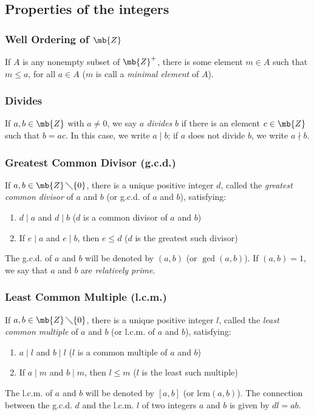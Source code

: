 \subsection{Properties of the integers}
\subsubsection{Well Ordering of \texorpdfstring{$\mb{Z}$}{Z}}
If $A$ is any nonempty subset of $\mb{Z}^{+}$, there is some element $m\in A$ such that
$m\le a$, for all $a\in A$ ($m$ is call a {\sl minimal element} of $A$).

\subsubsection{Divides}
If $a,b\in \mb{Z}$ with $a\neq 0$, we say $a$ {\sl divides} $b$ if there is an element $c\in\mb{Z}$ such that
$b = ac$. In this case, we write $a\mid b$; if $a$ does not divide $b$, we write $a\nmid b$.

\subsubsection{Greatest Common Divisor (g.c.d.)}
If $a,b\in \mb{Z}\,\diagdown\{0\}$, there is a unique positive integer $d$, called the {\sl greatest common divisor} of $a$ and $b$
(or g.c.d. of $a$ and $b$), satisfying:
\begin{enumerate}[leftmargin=20pt, itemsep=0pt, topsep=3pt, label=(\arabic*)]
    \item $d\mid a$ and $d\mid b$ ($d$ is a common divisor of $a$ and $b$)
    \item If $e\mid a$ and $e\mid b$, then $e\le d$ ($d$ is the greatest such divisor)
\end{enumerate}
The g.c.d. of $a$ and $b$ will be denoted by $(a,b)$ (or $\gcd(a,b)$).
If $(a,b)=1$, we say that $a$ and $b$ are {\sl relatively prime}.

\subsubsection{Least Common Multiple (l.c.m.)}
If $a,b\in \mb{Z}\,\diagdown\{0\}$, there is a unique positive integer $l$, called the {\sl least common multiple} of $a$ and $b$
(or l.c.m. of $a$ and $b$), satisfying:
\begin{enumerate}[leftmargin=20pt, itemsep=0pt, topsep=3pt, label=(\arabic*)]
    \item $a\mid l$ and $b\mid l$ ($l$ is a common multiple of $a$ and $b$)
    \item If $a\mid m$ and $b\mid m$, then $l\le m$ ($l$ is the least such multiple)
\end{enumerate}
The l.c.m. of $a$ and $b$ will be denoted by $[a,b]$ (or $\mathrm{lcm}(a,b)$).
The connection between the g.c.d. $d$ and the l.c.m. $l$ of two integers $a$ and $b$ is given by $dl=ab$.

